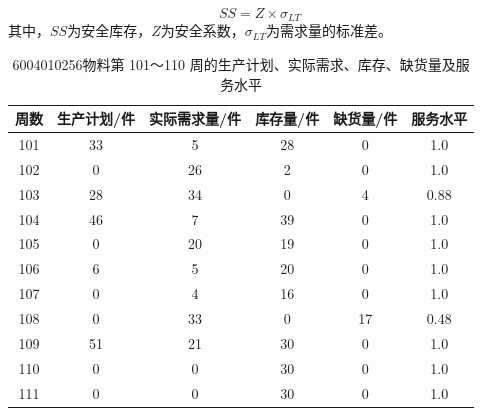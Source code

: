 \documentclass{cumcmthesis}
\begin{document}
        \[
        SS = Z \times \sigma_{LT}
        \]
        其中，$SS$为安全库存，$Z$为安全系数，$\sigma_{LT}$为需求量的标准差。\\

        %
        
        \begin{table}[htbp]
            \centering
            \small %
            \begin{tabular}{cccccc}
            \toprule
            周数 & 生产计划/件 & 实际需求量/件 & 库存量/件 & 缺货量/件 & 服务水平 \\
            \midrule
            101 & 33 & 5 & 28 & 0 & 1.0 \\
            102 & 0 & 26 & 2 & 0 & 1.0 \\
            103 & 28 & 34 & 0 & 4 & 0.88 \\
            104 & 46 & 7 & 39 & 0 & 1.0 \\
            105 & 0 & 20 & 19 & 0 & 1.0 \\
            106 & 6 & 5 & 20 & 0 & 1.0 \\
            107 & 0 & 4 & 16 & 0 & 1.0 \\
            108 & 0 & 33 & 0 & 17 & 0.48 \\
            109 & 51 & 21 & 30 & 0 & 1.0 \\
            110 & 0 & 0 & 30 & 0 & 1.0 \\
            111 & 0 & 0 & 30 & 0 & 1.0 \\
            \bottomrule
            \end{tabular}
            \caption{6004010256物料第 101～110 周的生产计划、实际需求、库存、缺货量及服务水平}
            \label{tab:prod_inv_data} %
        \end{table}
        \FloatBarrier    %
        
\end{document}
